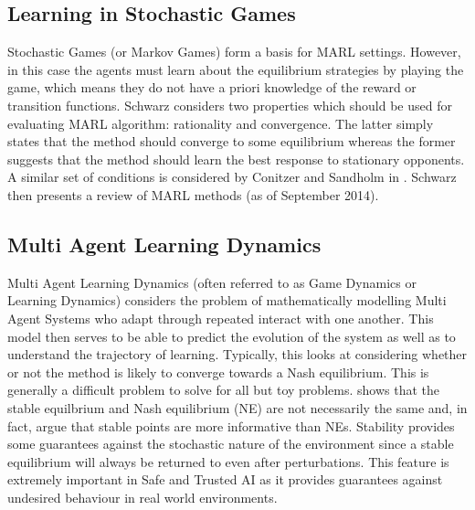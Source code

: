 \documentclass[.../main.tex]{subfiles}
\begin{document}
\subsection{Learning in Stochastic Games} \label{sec::Learning_Stochastic_Games}

Stochastic Games (or Markov Games) form a basis for MARL
settings. However, in this case the agents must learn about the
equilibrium strategies by playing the game, which means they do not
have a priori knowledge of the reward or transition functions. Schwarz \cite{SchwartzMulti-agentApproach}
considers two properties which should be used for evaluating MARL
algorithm: rationality and convergence. The latter simply states that
the method should converge to some equilibrium whereas the former
suggests that the method should learn the best response to stationary
opponents. A similar set of conditions is considered by Conitzer and
Sandholm in \cite{ConitzerAWESOME:}. Schwarz then presents a review of MARL methods (as of
September 2014). 


\subsection{Multi Agent Learning Dynamics} \label{sec::MARL_Dynamics}

Multi Agent Learning Dynamics (often referred to as Game Dynamics or
Learning Dynamics) considers the problem of mathematically modelling
Multi Agent Systems who adapt through repeated interact with one
another. This model then serves to be able to predict the evolution of
the system as well as to understand the trajectory of
learning. Typically, this looks at considering whether or not the
method is likely to converge towards a Nash equilibrium. This is
generally a difficult problem to solve
\cite{ShohamMultiagentFoundations} for all but toy problems.
\cite{Letcher2019DifferentiableMechanics} shows that the stable
equilbrium and Nash equilibrium (NE) are not necessarily the same and,
in fact, argue that stable points are more informative than NEs.
Stability provides some guarantees against the stochastic nature of
the environment since a stable equilibrium will always be returned to
even after perturbations. This feature is extremely important in Safe
and Trusted AI as it provides guarantees against undesired behaviour
in real world environments.
\end{document}
